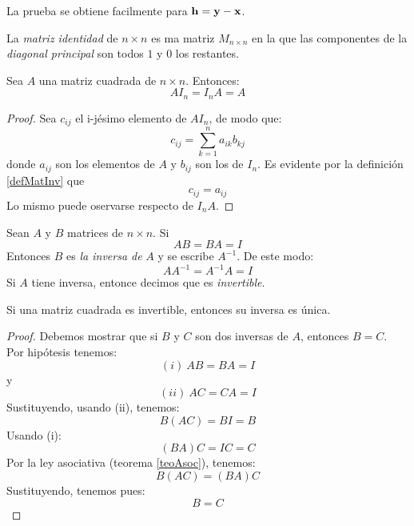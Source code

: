\documentclass[alge.tex]{subfiles}
\begin{document}
La prueba se obtiene facilmente para \(\mathbf{h} = \mathbf{y} - \mathbf{x}\).

\vspace{.25cm}

\begin{mydef} \label{defMatInv}
  La \emph{matriz identidad} de \(n \times n\) es ma matriz \(M_{n
    \times n}\) en la que las componentes de la \emph{diagonal
    principal} son todos \(1\) y \(0\) los restantes.
\end{mydef}

\begin{teo}
  Sea \(A\) una matriz cuadrada de \(n \times n\). Entonces:
  \[AI_n = I_nA = A\]
\end{teo}
\begin{proof}
  Sea \(c_{ij}\) el i-j\'esimo elemento de \(AI_n\), de modo que:
  \[c_{ij}= \sum_{k=1}^n a_{ik}b_{kj}\]
  donde \(a_{ij}\) son los elementos de \(A\) y \(b_{ij}\) son los de
  \(I_n\). Es evidente por la definici\'on \ref{defMatInv} que 
  \[c_{ij} = a_{ij}\]
  Lo mismo puede oservarse respecto de \(I_nA\).
\end{proof}

\begin{mydef}\label{defInv}
  Sean \(A\) y \(B\) matrices de \(n \times n\). Si 
  \[AB = BA = I\]
  Entonces \(B\) es \emph{la inversa de} \(A\) y se escribe
  \(A^{-1}\). De este modo:
  \[ AA^{-1} = A^{-1}A = I\]
  Si \(A\) tiene inversa, entonce decimos que es \emph{invertible}.
\end{mydef}

\begin{teo} \label{teoMatInvUni}
  Si una matriz cuadrada es invertible, entonces su inversa es \'unica.
\end{teo}
\begin{proof}
  Debemos mostrar que si \(B\) y \(C\) son dos inversas de \(A\),
  entonces \(B = C\).\\
  Por hip\'otesis tenemos:
  \[(i) \ AB=BA=I\]
  y
  \[(ii) \ AC=CA=I\]
  Sustituyendo, usando (ii), tenemos:
  \[B(AC) = BI = B\]
  Usando (i):
  \[(BA)C = IC = C\]
  Por la ley asociativa (teorema \ref{teoAsoc}), tenemos:
  \[B(AC)=(BA)C\]
  Sustituyendo, tenemos pues:
  \[B=C\]
\end{proof}
\end{document}

